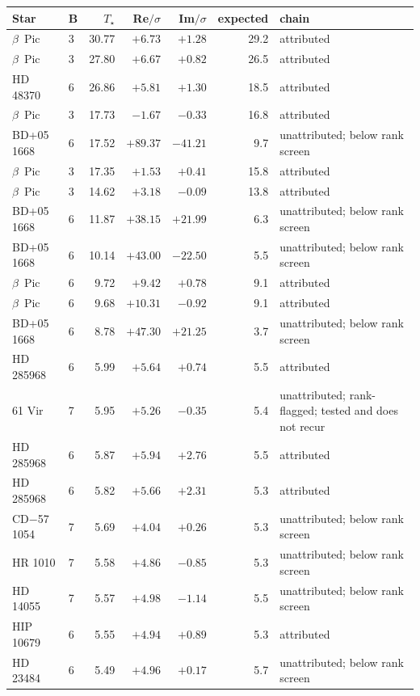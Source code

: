 \begin{tabular}{@{}llrrrrl@{}}
\toprule
Star & B & $T_\star$ & Re$/\sigma$ & Im$/\sigma$ & expected & chain \\
\midrule
$\beta$~Pic & 3 & 30.77 & $+6.73$ & $+1.28$ & 29.2 & attributed \\
$\beta$~Pic & 3 & 27.80 & $+6.67$ & $+0.82$ & 26.5 & attributed \\
HD 48370 & 6 & 26.86 & $+5.81$ & $+1.30$ & 18.5 & attributed \\
$\beta$~Pic & 3 & 17.73 & $-1.67$ & $-0.33$ & 16.8 & attributed \\
BD+05 1668 & 6 & 17.52 & $+89.37$ & $-41.21$ & 9.7 & unattributed; below rank screen \\
$\beta$~Pic & 3 & 17.35 & $+1.53$ & $+0.41$ & 15.8 & attributed \\
$\beta$~Pic & 3 & 14.62 & $+3.18$ & $-0.09$ & 13.8 & attributed \\
BD+05 1668 & 6 & 11.87 & $+38.15$ & $+21.99$ & 6.3 & unattributed; below rank screen \\
BD+05 1668 & 6 & 10.14 & $+43.00$ & $-22.50$ & 5.5 & unattributed; below rank screen \\
$\beta$~Pic & 6 & 9.72 & $+9.42$ & $+0.78$ & 9.1 & attributed \\
$\beta$~Pic & 6 & 9.68 & $+10.31$ & $-0.92$ & 9.1 & attributed \\
BD+05 1668 & 6 & 8.78 & $+47.30$ & $+21.25$ & 3.7 & unattributed; below rank screen \\
HD 285968 & 6 & 5.99 & $+5.64$ & $+0.74$ & 5.5 & attributed \\
61 Vir & 7 & 5.95 & $+5.26$ & $-0.35$ & 5.4 & unattributed; rank-flagged; tested and does not recur \\
HD 285968 & 6 & 5.87 & $+5.94$ & $+2.76$ & 5.5 & attributed \\
HD 285968 & 6 & 5.82 & $+5.66$ & $+2.31$ & 5.3 & attributed \\
CD$-$57 1054 & 7 & 5.69 & $+4.04$ & $+0.26$ & 5.3 & unattributed; below rank screen \\
HR 1010 & 7 & 5.58 & $+4.86$ & $-0.85$ & 5.3 & unattributed; below rank screen \\
HD 14055 & 7 & 5.57 & $+4.98$ & $-1.14$ & 5.5 & unattributed; below rank screen \\
HIP 10679 & 6 & 5.55 & $+4.94$ & $+0.89$ & 5.3 & attributed \\
HD 23484 & 6 & 5.49 & $+4.96$ & $+0.17$ & 5.7 & unattributed; below rank screen \\

\end{tabular}
